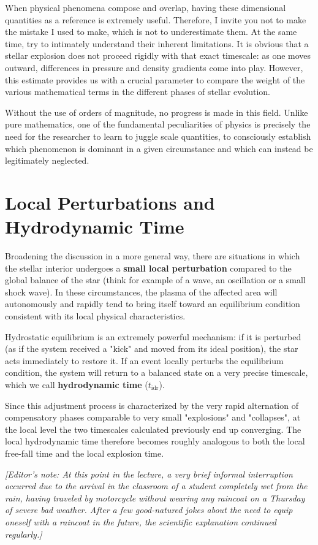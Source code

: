 When physical phenomena compose and overlap, having these dimensional quantities as a reference is extremely useful. Therefore, I invite you not to make the mistake I used to make, which is not to underestimate them. At the same time, try to intimately understand their inherent limitations. It is obvious that a stellar explosion does not proceed rigidly with that exact timescale: as one moves outward, differences in pressure and density gradients come into play. However, this estimate provides us with a crucial parameter to compare the weight of the various mathematical terms in the different phases of stellar evolution.

Without the use of orders of magnitude, no progress is made in this field. Unlike pure mathematics, one of the fundamental peculiarities of physics is precisely the need for the researcher to learn to juggle scale quantities, to consciously establish which phenomenon is dominant in a given circumstance and which can instead be legitimately neglected.

\section{Local Perturbations and Hydrodynamic Time}
Broadening the discussion in a more general way, there are situations in which the stellar interior undergoes a \textbf{small local perturbation} compared to the global balance of the star (think for example of a wave, an oscillation or a small shock wave).
In these circumstances, the plasma of the affected area will autonomously and rapidly tend to bring itself toward an equilibrium condition consistent with its local physical characteristics.

Hydrostatic equilibrium is an extremely powerful mechanism: if it is perturbed (as if the system received a "kick" and moved from its ideal position), the star acts immediately to restore it. If an event locally perturbs the equilibrium condition, the system will return to a balanced state on a very precise timescale, which we call \textbf{hydrodynamic time} ($t_{\text{idr}}$).

Since this adjustment process is characterized by the very rapid alternation of compensatory phases comparable to very small "explosions" and "collapses", at the local level the two timescales calculated previously end up converging. The local hydrodynamic time therefore becomes roughly analogous to both the local free-fall time and the local explosion time.

\textit{[Editor's note: At this point in the lecture, a very brief informal interruption occurred due to the arrival in the classroom of a student completely wet from the rain, having traveled by motorcycle without wearing any raincoat on a Thursday of severe bad weather. After a few good-natured jokes about the need to equip oneself with a raincoat in the future, the scientific explanation continued regularly.]}

